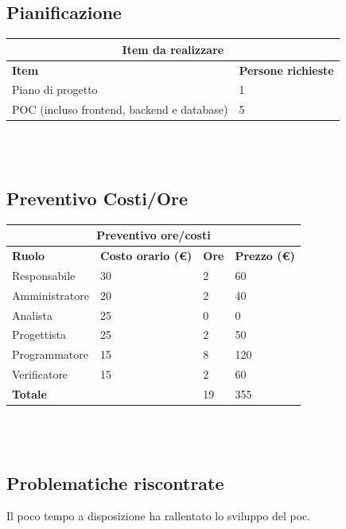 \documentclass[12pt]{article}
\begin{document}
\subsection{Pianificazione}
\begin{center}
    \begin{tabularx}{\textwidth}{|X|X|}
        \hline
        \multicolumn{2}{|c|}{\textbf{Item da realizzare}}\\
        \hline
        \hline
        \textbf{Item} & \textbf{Persone richieste}\\
        \hline
        Piano di progetto & 1\\
        \hline
        POC (incluso frontend, backend e database) & 5 \\
        \hline
    \end{tabularx}\\[8pt]
    \mbox{}\\
\end{center}
\subsection{Preventivo Costi/Ore}
\begin{center}
    \begin{tabularx}{\textwidth}{|X|X|X|X|}
        \hline
        \multicolumn{4}{|c|}{\textbf{Preventivo ore/costi}}\\
        \hline
        \hline
        \textbf{Ruolo} & \textbf{Costo orario (\euro)} & \textbf{Ore} & \textbf{Prezzo (\euro)}\\
        \hline
        Responsabile    & 30 & 2 & 60\\   
        \hline
        Amministratore  & 20 & 2  & 40\\ 
        \hline
        Analista        & 25 & 0  & 0\\ 
        \hline
        Progettista     & 25 & 2  & 50\\
        \hline
        Programmatore   & 15 & 8  & 120\\
        \hline
        Verificatore    & 15 & 2  & 60\\
        \hline  
        \textbf{Totale} &    & 19 & 355\\
        \hline
    \end{tabularx}\\[8pt]
    \mbox{}\\
\end{center}
\subsection{Problematiche riscontrate}
Il poco tempo a disposizione ha rallentato lo sviluppo del poc.
\end{document}
